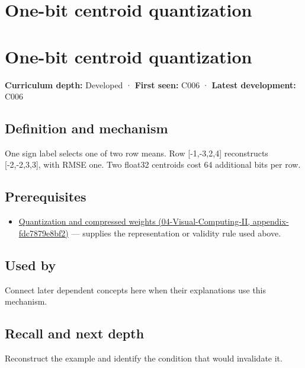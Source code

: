 \hypertarget{appendix-4ccd7a775813}{}
\section*{One-bit centroid quantization}
\section{One-bit centroid quantization}\label{appendix-4ccd7a775813-one-bit-centroid-quantization}

\textbf{Curriculum depth:} Developed · \textbf{First seen:} C006 · \textbf{Latest development:} C006

\subsection{Definition and mechanism}\label{appendix-4ccd7a775813-definition-and-mechanism}

One sign label selects one of two row means. Row {[}-1,-3,2,4{]} reconstructs {[}-2,-2,3,3{]}, with RMSE one. Two float32 centroids cost 64 additional bits per row.

\subsection{Prerequisites}\label{appendix-4ccd7a775813-prerequisites}

\begin{itemize}
\tightlist
\item
  \href{../04-Visual-Computing-II/main.pdf\#nameddest=appendix-fdc7879e8bf2}{Quantization and compressed weights (04-Visual-Computing-II, appendix-fdc7879e8bf2)} --- supplies the representation or validity rule used above.
\end{itemize}

\subsection{Used by}\label{appendix-4ccd7a775813-used-by}

Connect later dependent concepts here when their explanations use this mechanism.

\subsection{Recall and next depth}\label{appendix-4ccd7a775813-recall-and-next-depth}

Reconstruct the example and identify the condition that would invalidate it.

